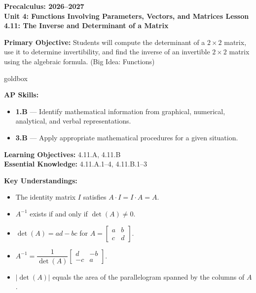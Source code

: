 \documentclass[10pt]{article}
\newcommand{\CourseName}{Precalculus}
\newcommand{\SchoolYear}{2026--2027}
\newcommand{\UnitNumberName}{Unit 4: Functions Involving Parameters, Vectors, and Matrices \quad}
\newcommand{\LessonNumberName}{Lesson 4.11: The Inverse and Determinant of a Matrix}
\begin{document}
\begin{center}
    {\Large\bfseries \CourseName: \SchoolYear \\
    {\small\bfseries \UnitNumberName \LessonNumberName}}
\end{center}

\begin{tcolorbox}[colback=sky, colframe=navy, boxrule=0.9pt, arc=2mm,
    left=2mm, right=2mm, top=1.5mm, bottom=1.5mm]
    \textbf{Primary Objective:} Students will compute the determinant of a $2\times2$ matrix,
    use it to determine invertibility, and find the inverse of an invertible $2\times2$ matrix
    using the algebraic formula. (Big Idea: Functions)
\end{tcolorbox}

\renewcommand{\arraystretch}{1.6}
\begin{skillbox}{goldbox}
\begin{minipage}[t]{0.48\linewidth}\vspace{0pt}
    \textbf{AP Skills:}
    \begin{itemize}[leftmargin=1.2em, itemsep=2pt]
        \item \textbf{1.B} --- Identify mathematical information from graphical, numerical,
              analytical, and verbal representations.
        \item \textbf{3.B} --- Apply appropriate mathematical procedures for a given situation.
    \end{itemize}
    \smallskip
    \textbf{Learning Objectives:} 4.11.A, 4.11.B\\
    \textbf{Essential Knowledge:} 4.11.A.1--4, 4.11.B.1--3
\end{minipage}\hfill
\begin{minipage}[t]{0.48\linewidth}\vspace{0pt}
    \textbf{Key Understandings:}
    \begin{itemize}[leftmargin=1.2em, itemsep=2pt]
        \item The identity matrix $I$ satisfies $A \cdot I = I \cdot A = A$.
        \item $A^{-1}$ exists if and only if $\det(A) \ne 0$.
        \item $\det(A) = ad - bc$ for $A = \begin{bmatrix}a&b\\c&d\end{bmatrix}$.
        \item $A^{-1} = \dfrac{1}{\det(A)}\begin{bmatrix}d&-b\\-c&a\end{bmatrix}$.
        \item $|\det(A)|$ equals the area of the parallelogram spanned by the columns of $A$.
    \end{itemize}
\end{minipage}
\end{skillbox}
\end{document}
